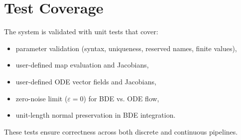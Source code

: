 \documentclass[11pt]{article}
\begin{document}
\section{Test Coverage}
The system is validated with unit tests that cover:
\begin{itemize}
\item parameter validation (syntax, uniqueness, reserved names, finite values),
\item user-defined map evaluation and Jacobians,
\item user-defined ODE vector fields and Jacobians,
\item zero-noise limit ($\varepsilon = 0$) for BDE vs. ODE flow,
\item unit-length normal preservation in BDE integration.
\end{itemize}
These tests ensure correctness across both discrete and continuous pipelines.
\end{document}
